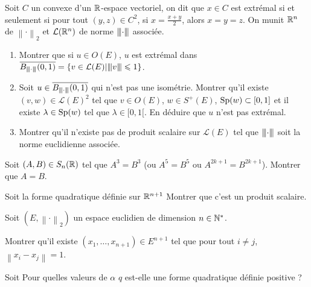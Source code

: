 \documentclass[12pt]{article}
\begin{document}
\begin{exercise}
	Soit $C$ un convexe d'un $\mathbb{R}$-espace vectoriel, on dit que $x\in C$ est extrémal si et seulement si pour tout $(y,z)\in C^{2}$, si $x=\frac{x+y}{2}$, alors $x=y=z$. On munit $\mathbb{R}^{n}$ de $\left\lVert\cdot\right\rVert_{2}$ et $\mathcal{L}(\mathbb{R}^{n})$ de norme ${\left\vert\kern-0.25ex\left\vert\kern-0.25ex\left\vert{}\cdot \right\vert\kern-0.25ex\right\vert\kern-0.25ex\right\vert}$ associée.

	\begin{enumerate}
		\item Montrer que si $u\in O(E)$, $u$ est extrémal dans $\overline{B_{{\left\vert\kern-0.25ex\left\vert\kern-0.25ex\left\vert{}\cdot \right\vert\kern-0.25ex\right\vert\kern-0.25ex\right\vert}}(0,1)}=\left\lbrace v\in\mathcal{L}(E)\middle|{\left\vert\kern-0.25ex\left\vert\kern-0.25ex\left\vert{}v \right\vert\kern-0.25ex\right\vert\kern-0.25ex\right\vert}\leqslant1\right\rbrace$.
		\item Soit $u\in\overline{B_{{\left\vert\kern-0.25ex\left\vert\kern-0.25ex\left\vert{}\cdot \right\vert\kern-0.25ex\right\vert\kern-0.25ex\right\vert}}(0,1)}$ qui n'est pas une isométrie. Montrer qu'il existe $(v,w)\in\mathcal{L}(E)^{2}$ tel que $v\in O(E)$, $w\in S^{+}(E)$, $\operatorname{Sp}(w)\subset[0,1]$ et il existe $\lambda\in\operatorname{Sp}(w)$ tel que $\lambda\in[0,1[$. En déduire que $u$ n'est pas extrémal.
		\item Montrer qu'il n'existe pas de produit scalaire sur $\mathcal{L}(E)$ tel que ${\left\vert\kern-0.25ex\left\vert\kern-0.25ex\left\vert{}\cdot \right\vert\kern-0.25ex\right\vert\kern-0.25ex\right\vert}$ soit la norme euclidienne associée.
	\end{enumerate}
\end{exercise}

\begin{exercise}
	Soit $(A,B)\in S_n(\mathbb{R})$ tel que $A^{3}=B^{3}$ (ou $A^{5}=B^{5}$ ou $A^{2k+1}=B^{2k+1}$). Montrer que $A=B$.
\end{exercise}

\begin{exercise}
	Soit la forme quadratique définie sur $\mathbb{R}^{n+1}$ 
	Montrer que c'est un produit scalaire.
\end{exercise}

\begin{exercise}
	Soit $(E,\left\lVert\cdot\right\rVert_{2})$ un espace euclidien de dimension $n\in\mathbb{N}^{*}$. 
	
	Montrer qu'il existe $(x_1,\dots,x_{n+1})\in E^{n+1}$ tel que pour tout $i\neq j$, $\left\lVert x_i-x_j\right\rVert=1$.
\end{exercise}

\begin{exercise}
	Soit 
	Pour quelles valeurs de $\alpha$ $q$ est-elle une forme quadratique définie positive ?
\end{exercise}
\end{document}
